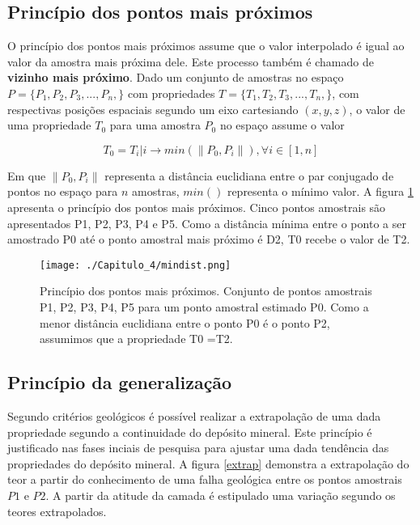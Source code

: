\subsection{Princípio dos pontos mais próximos} 

O princípio dos pontos mais próximos assume que o valor interpolado é igual ao valor da amostra mais próxima dele. Este processo também é chamado de \textbf{vizinho mais próximo}. Dado um conjunto de amostras no espaço $P = \{P_{1},P_{2},P_{3},...,P_{n},\}$ com propriedades $T = \{T_{1},T_{2},T_{3},...,T_{n},\}$, com respectivas posições espaciais segundo um eixo cartesiando $(x,y,z)$, o valor de uma propriedade $T_{0}$ para uma amostra $P_{0}$ no espaço assume o valor 

\begin{equation}\label{vizinhoprox}
T_{0} = T_{i} | i \rightarrow min(\| P_{0},P_{i}\|), \forall i\in [1,n]
\end{equation}

Em que $\| P_{0},P_{i}\|$ representa a distância euclidiana entre o par conjugado de pontos no espaço para $n$ amostras, $min()$ representa o mínimo valor. A figura \ref{mindist} apresenta o princípio dos pontos mais próximos. Cinco pontos amostrais são apresentados P1, P2, P3, P4 e P5. Como a distância mínima entre o ponto a ser amostrado P0 até o ponto amostral mais próximo é D2, T0 recebe o valor de T2. 

\FloatBarrier
\begin{figure}[!htpb]
	\centering
	\texttt{[image: ./Capitulo\_4/mindist.png]}	
	\caption{Princípio dos pontos mais próximos. Conjunto de pontos amostrais P1, P2, P3, P4, P5 para um ponto amostral estimado P0. Como a menor distância euclidiana entre o ponto P0 é o ponto P2, assumimos que a propriedade T0 =T2. }
	\label{mindist}
\end{figure}
\FloatBarrier 

\subsection{Princípio da generalização}

Segundo critérios geológicos é possível realizar a extrapolação de uma dada propriedade segundo a continuidade do depósito mineral. Este princípio é justificado nas fases inciais de pesquisa para ajustar uma dada tendência das propriedades do depósito mineral. A figura \ref{extrap} demonstra a extrapolação do teor a partir do conhecimento de uma falha geológica entre os pontos amostrais $P1$ e $P2$. A partir da atitude da camada é estipulado uma variação segundo os teores extrapolados.

